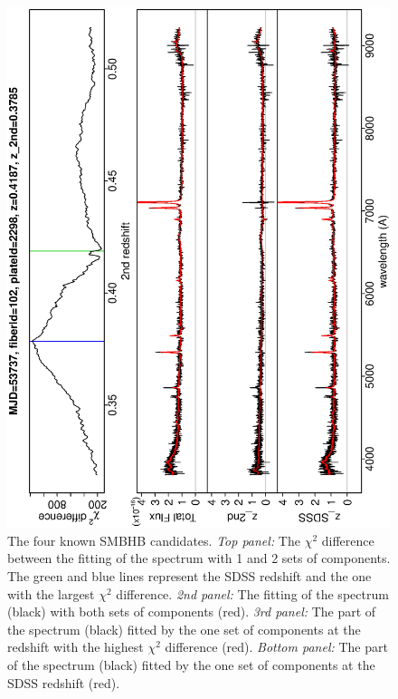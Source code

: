 \documentclass[12pt,preprint]{aastex}
\begin{document}
\begin{figure}
\includegraphics[angle=-90,width=0.49\columnwidth]{paper_plots/4qq}
\caption{The four known SMBHB candidates. \textsl{Top panel:} The
  $\chi^2$ difference between the fitting of the spectrum with 1 and 2
  sets of components. The green and blue lines represent the SDSS
  redshift and the one with the largest $\chi^2$
  difference. \textsl{2nd panel:} The fitting of the spectrum (black)
  with both sets of components (red). \textsl{3rd panel:} The part of
  the spectrum (black) fitted by the one set of components at the
  redshift with the highest $\chi^2$ difference (red). \textsl{Bottom
    panel:} The part of the spectrum (black) fitted by the one set of
  components at the SDSS redshift (red).}
\label{fig:6a}
\end{figure}
\end{document}
